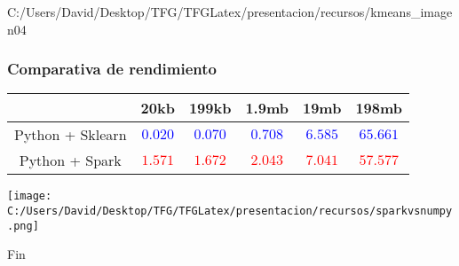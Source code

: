 \documentclass{beamer}
\begin{document}

\begin{frame} %
  {C:/Users/David/Desktop/TFG/TFGLatex/presentacion/recursos/kmeans_imagen}{0}{4}
\end{frame}


\begin{frame}[fragile] %
\frametitle{Comparativa de rendimiento}

\begin{table}[!htbp]\small
  \centering
  \begin{tabular}{|c|c|c|c|c|c|} %
    \hline
    & 20kb & 199kb & 1.9mb & 19mb & 198mb \\ \hline
    Python + Sklearn & \textcolor{blue}{$0.020$} & \textcolor{blue}{$0.070$} & \textcolor{blue}{$0.708$} & \textcolor{blue}{$6.585$} & \textcolor{blue}{$65.661$} \\ \hline
    Python + Spark & \textcolor{red}{$1.571$} & \textcolor{red}{$1.672$} & \textcolor{red}{$2.043$} & \textcolor{red}{$7.041$} & \textcolor{red}{$57.577$} \\ \hline
  \end{tabular}
\end{table}

\centering
\texttt{[image: C:/Users/David/Desktop/TFG/TFGLatex/presentacion/recursos/sparkvsnumpy.png]}

\end{frame}


\begin{frame}
\Huge{\centerline{Fin}}
\end{frame}

\end{document}

